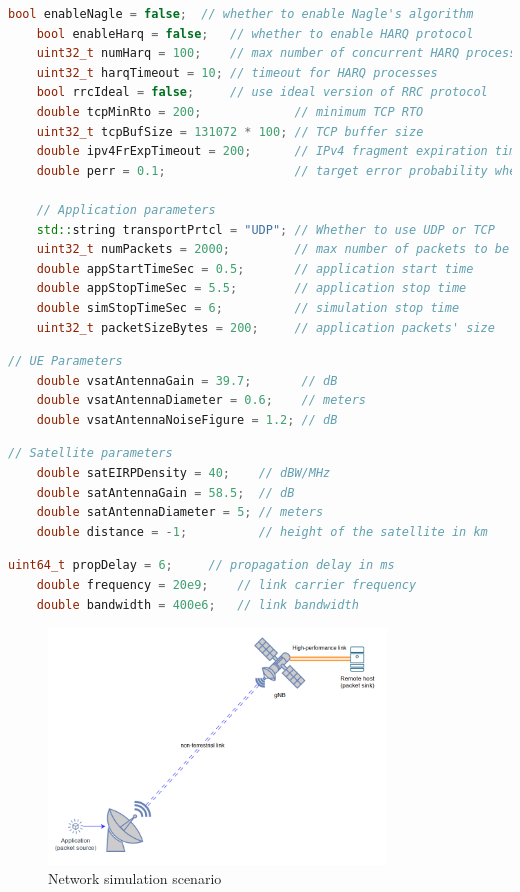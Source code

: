 \begin{lstlisting}[language=C++, caption=Application and UE configuration parameters, label=code:ue_parameters]
    bool enableNagle = false;  // whether to enable Nagle's algorithm
    bool enableHarq = false;   // whether to enable HARQ protocol
    uint32_t numHarq = 100;    // max number of concurrent HARQ processes
    uint32_t harqTimeout = 10; // timeout for HARQ processes
    bool rrcIdeal = false;     // use ideal version of RRC protocol
    double tcpMinRto = 200;             // minimum TCP RTO
    uint32_t tcpBufSize = 131072 * 100; // TCP buffer size
    double ipv4FrExpTimeout = 200;      // IPv4 fragment expiration timeout
    double perr = 0.1;                  // target error probability when transmitting PHY-level packets

    // Application parameters
    std::string transportPrtcl = "UDP"; // Whether to use UDP or TCP
    uint32_t numPackets = 2000;         // max number of packets to be sent
    double appStartTimeSec = 0.5;       // application start time
    double appStopTimeSec = 5.5;        // application stop time
    double simStopTimeSec = 6;          // simulation stop time
    uint32_t packetSizeBytes = 200;     // application packets' size
\end{lstlisting}

\begin{lstlisting}[language=C++, caption=UE antenna parameters, label=code:tx_parameters]
    // UE Parameters
    double vsatAntennaGain = 39.7;       // dB
    double vsatAntennaDiameter = 0.6;    // meters
    double vsatAntennaNoiseFigure = 1.2; // dB 
\end{lstlisting}

\begin{lstlisting}[language=C++, caption=Satellite antenna parameters, label=code:sat_parameters]
    // Satellite parameters
    double satEIRPDensity = 40;    // dBW/MHz
    double satAntennaGain = 58.5;  // dB
    double satAntennaDiameter = 5; // meters
    double distance = -1;          // height of the satellite in km
\end{lstlisting}

\begin{lstlisting}[language=C++, caption=Non-terrestrial link parameters, label=code:link_parameters]
    uint64_t propDelay = 6;     // propagation delay in ms
    double frequency = 20e9;    // link carrier frequency
    double bandwidth = 400e6;   // link bandwidth
\end{lstlisting}

\begin{figure}[ht]
    \centering
    \includegraphics[width=0.8\textwidth]{res/sim-scenario.png}
    \caption{Network simulation scenario}
    \label{fig:sim-scenario}
\end{figure}
